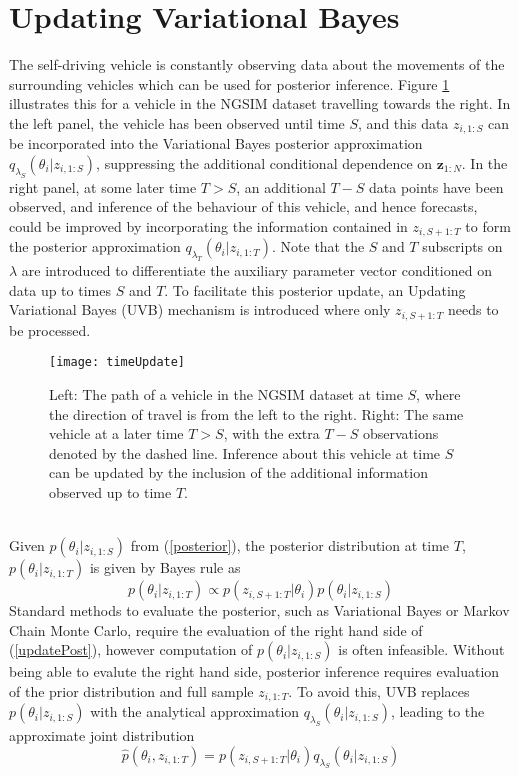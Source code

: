 \documentclass[12pt,a4paper]{article}\usepackage[]{graphicx}\usepackage[]{color}
\begin{document}
\section{Updating Variational Bayes}
\label{sec:UVB}

The self-driving vehicle is constantly observing data about the movements of the surrounding vehicles which can be used for posterior inference. Figure \ref{fig:timeUpdate} illustrates this for a vehicle in the NGSIM dataset travelling towards the right. In the left panel, the vehicle has been observed until time $S$, and this data $z_{i, 1:S}$ can be incorporated into the Variational Bayes posterior approximation $q_{\lambda_S}(\theta_{i} | z_{i, 1:S})$, suppressing the additional conditional dependence on $\textbf{z}_{1:N}$. In the right panel, at some later time $T > S$, an additional $T - S$ data points have been observed, and inference of the behaviour of this vehicle, and hence forecasts, could be improved by incorporating the information contained in $z_{i, S+1:T}$ to form the posterior approximation $q_{\lambda_T}(\theta_{i} | z_{i, 1:T})$. Note that the $S$ and $T$ subscripts on $\lambda$ are introduced to differentiate the auxiliary parameter vector conditioned on data up to times $S$ and $T$. To facilitate this posterior update, an Updating Variational Bayes (UVB) mechanism is introduced where only $z_{i, S+1:T}$ needs to be processed.
\begin{figure}[ht]
\centering
\texttt{[image: timeUpdate]}
\caption{Left: The path of a vehicle in the NGSIM dataset at time $S$, where the direction of travel is from the left to the right. Right: The same vehicle at a later time $T > S$, with the extra $T - S$ observations denoted by the dashed line. Inference about this vehicle at time $S$ can be updated by the inclusion of the additional information observed up to time $T$.}
\label{fig:timeUpdate}
\end{figure}
\\

Given $p(\theta_{i} | z_{i, 1:S})$ from (\ref{posterior}), the posterior distribution at time $T$, $p(\theta_{i} | z_{i, 1:T})$ is given by Bayes rule as
\begin{equation}
\label{updatePost}
p(\theta_{i} | z_{i, 1:T}) \propto p(z_{i, S+1:T} | \theta_{i})p(\theta_{i} | z_{i, 1:S})
\end{equation}
Standard methods to evaluate the posterior, such as Variational Bayes or Markov Chain Monte Carlo, require the evaluation of the right hand side of (\ref{updatePost}), however computation of $p(\theta_{i} | z_{i, 1:S})$ is often infeasible. Without being able to evalute the right hand side, posterior inference requires evaluation of the prior distribution and full sample $z_{i, 1:T}$. To avoid this, UVB replaces $p(\theta_{i} | z_{i, 1:S})$ with the analytical approximation $q_{\lambda_S}(\theta_{i} | z_{i, 1:S})$, leading to the approximate joint distribution
\begin{equation}
\label{ApproxJoint}
\hat{p}(\theta_{i},  z_{i, 1:T}) = p(z_{i, S+1:T} | \theta_{i})q_{\lambda_S}(\theta_{i} | z_{i, 1:S})
\end{equation}
\\
\end{document}
